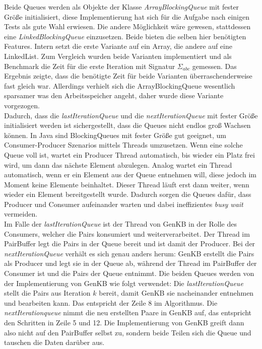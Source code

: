 \documentclass[12pt,a4paper]{article}
\begin{document}
Beide Queues werden als Objekte der Klasse \textit{ArrayBlockingQueue} mit fester Größe initialisiert, diese Implementierung hat sich für die Aufgabe nach einigen Tests als gute Wahl erwiesen. Die andere Möglichkeit wäre gewesen, stattdessen eine \textit{LinkedBlockingQueue} einzusetzen. Beide bieten die selben hier benötigten Features. Intern setzt die erste Variante auf ein Array, die andere auf eine LinkedList. Zum Vergleich wurden beide Varianten implementiert und als Benchmark die Zeit für die erste Iteration mit Signatur $\Sigma_{abc}$ gemessen. Das Ergebnis zeigte, dass die benötigte Zeit für beide Varianten überraschenderweise fast gleich war.  Allerdings verhielt sich die ArrayBlockingQueue wesentlich sparsamer was den Arbeitsspeicher angeht, daher wurde diese Variante vorgezogen. \\
Dadurch, dass die \textit{lastIterationQueue} und die \textit{nextIterationQueue} mit fester Größe initialisiert werden ist sichergestellt, dass die Queues nicht endlos groß Wachsen können. In Java sind BlockingQueues mit fester Größe gut geeignet, um Consumer-Producer Szenarios  mittels Threads umzusetzen. Wenn eine solche Queue voll ist, wartet ein Producer Thread automatisch, bis wieder ein Platz frei wird, um dann das nächste Element abzulegen. Analog wartet ein Thread automatisch, wenn er ein Element aus der Queue entnehmen will, diese jedoch im Moment keine Elemente beinhaltet. Dieser Thread läuft erst dann weiter, wenn wieder ein Element bereitgestellt wurde. Dadurch sorgen die Queues dafür, dass Producer und Consumer aufeinander warten und dabei ineffizientes \textit{busy wait} vermeiden.\\
Im Falle der \textit{lastIterationQueue} ist der Thread von GenKB in der Rolle des Consumers, welcher die Pairs konsumiert und weiterverarbeitet. Der Thread im PairBuffer legt die Pairs in der Queue bereit und ist damit der Producer. Bei der \textit{nextIterationQueue} verhält es sich genau anders herum: GenKB erstellt die Pairs als Producer und legt sie in der Queue ab, während der Thread im PairBuffer der Consumer ist und die Pairs der Queue entnimmt. Die beiden Queues werden von der Implementierung von GenKB wie folgt verwendet: Die \textit{lastIterationQueue} stellt die Pairs aus Iteration $k$ bereit, damit GenKB sie nacheinander entnehmen und bearbeiten kann. Das entspricht der Zeile 8 im Algorithmus. Die \textit{nextIterationqueue} nimmt die neu erstellten Paare in GenKB auf, das entspricht den Schritten in Zeile 5 und 12. Die Implementierung von GenKB greift dann also nicht auf den PairBuffer selbst zu, sondern beide Teilen sich die Queue und tauschen die Daten darüber aus. \\
\end{document}
